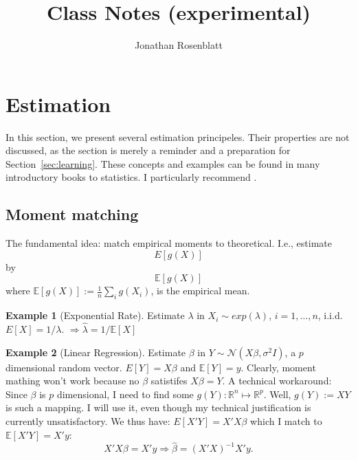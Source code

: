 \documentclass[12pt,a4paper]{article}
\author{Jonathan Rosenblatt}
\title{Class Notes (experimental)}
\theoremstyle{plain}
\theoremstyle{definition}
\newtheorem{example}{Example}
\newcommand{\expect}[1]{E\left[ #1 \right]}
\newcommand{\expectn}[1]{\mathbb{E}[#1]}
\newcommand{\gauss}[1]{\mathcal{N}(#1)}
\begin{document}
\maketitle

\tableofcontents



\section{Estimation}
\label{sec:estimation} 
In this section, we present several estimation principeles. 
Their properties are not discussed, as the section is merely a reminder and a preparation for Section~\ref{sec:learning}.
These concepts and examples can be found in many introductory books to statistics. I particularly recommend \citep{wasserman_all_2004}.

\subsection{Moment matching}
\label{sec:moment_matching}

The fundamental idea: match empirical moments to theoretical. I.e., estimate
$$ \expect{g(X)}   $$
by 
$$ \expectn{g(X)}   $$
where $\expectn{g(X)}:=\frac{1}{n}  \sum_i g(X_i)$, is the empirical mean.

\begin{example}[Exponential Rate]

Estimate $\lambda$ in $X_i \sim exp(\lambda)$, $i=1,\dots,n$, i.i.d.
$\expect{X}=1/\lambda$.
$\Rightarrow \hat{\lambda}=1/\expectn{X}$ 

\end{example}


\begin{example}[Linear Regression]

Estimate $\beta$ in $Y \sim \gauss{X\beta,\sigma^2 I}$, a $p$ dimensional random vector.
$\expect{Y}=X\beta$ and $\expectn{Y}=y$.
Clearly, moment mathing won't work because no $\beta$ satistifes $X\beta=Y$.
A technical workaround:
Since $\beta$ is $p$ dimensional, I need to find some $g(Y): \mathbb{R}^n \mapsto \mathbb{R}^p$.
Well, $g(Y):=XY$ is such a mapping. I will use it, even though my technical justification is currently unsatisfactory. We thus have:
$\expect{X'Y}=X'X\beta$ which I match to $\expectn{X'Y}=X'y$:
$$
  X'X \beta = X' y \Rightarrow \hat{\beta}=(X'X)^{-1} X'y.
$$

\end{example}
\end{document}
